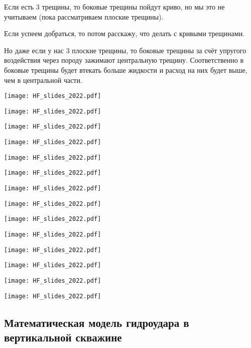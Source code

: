 \documentclass[main.tex]{subfiles}
\begin{document}
Если есть 3 трещины, то боковые трещины пойдут криво, но мы это не учитываем (пока рассматриваем плоские трещины).

Если успеем добраться, то потом расскажу, что делать с кривыми трещинами.

Но даже если у нас 3 плоские трещины, то боковые трещины за счёт упругого воздействия через породу зажимают центральную трещину.
Соответственно в боковые трещины будет втекать больше жидкости и расход на них будет выше, чем в центральной части.

\texttt{[image: HF\_slides\_2022.pdf]}

\texttt{[image: HF\_slides\_2022.pdf]}

\texttt{[image: HF\_slides\_2022.pdf]}

\texttt{[image: HF\_slides\_2022.pdf]}

\texttt{[image: HF\_slides\_2022.pdf]}

\texttt{[image: HF\_slides\_2022.pdf]}

\texttt{[image: HF\_slides\_2022.pdf]}

\texttt{[image: HF\_slides\_2022.pdf]}

\texttt{[image: HF\_slides\_2022.pdf]}

\texttt{[image: HF\_slides\_2022.pdf]}

\texttt{[image: HF\_slides\_2022.pdf]}

\texttt{[image: HF\_slides\_2022.pdf]}

\texttt{[image: HF\_slides\_2022.pdf]}

\texttt{[image: HF\_slides\_2022.pdf]}


\subsection{Математическая модель гидроудара в вертикальной скважине}
\end{document}
